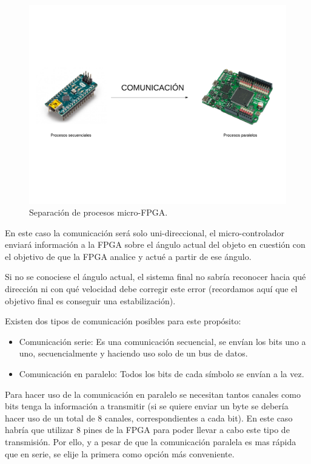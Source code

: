 \begin{figure}[H]
	\center
	\includegraphics[trim = 0mm 40mm 0mm 20mm, clip,scale=0.4]{imagenes/Balancing_robot/coexistencia1.pdf}
	\caption{Separación de procesos micro-FPGA.}
	\label{fig:coexistencia1}
\end{figure}

En este caso la comunicación será solo uni-direccional, el micro-controlador enviará información a la FPGA sobre el ángulo actual del objeto en cuestión con el objetivo de que la FPGA analice y actué a partir de ese ángulo.\newline

Si no se conociese el ángulo actual, el sistema final no sabría reconocer hacia qué dirección ni con qué velocidad debe corregir este error (recordamos aquí que el objetivo final es conseguir una estabilización). \newline

Existen dos tipos de comunicación posibles para este propósito: 
\begin{itemize}
	\item Comunicación serie: Es una comunicación secuencial, se envían los bits uno a uno, secuencialmente y haciendo uso solo de un bus de datos.
	\item Comunicación en paralelo: Todos los bits de cada símbolo se envían a la vez.
\end{itemize} 

Para hacer uso de la comunicación en paralelo se necesitan tantos canales como bits tenga la información a transmitir (si se quiere enviar un byte se debería hacer uso de un total de 8 canales, correspondientes a cada bit). En este caso habría que utilizar 8 pines de la FPGA para poder llevar a cabo este tipo de transmisión. Por ello, y a pesar de que la comunicación paralela es mas rápida que en serie, se elije la primera como opción más conveniente. \newline

